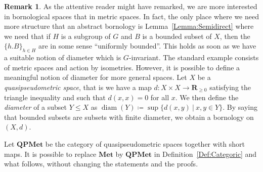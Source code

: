 \documentclass[a4paper]{article}
\newtheorem{prop}[lem]{Proposition}
\theoremstyle{definition}
\newtheorem{rem}[lem]{Remark}
\DeclareMathOperator\diam{diam}
\newcommand*{\field}[1]{\mathbf{#1}}
\newcommand*{\Z}{\field{Z}}
\newcommand{\setst}[2]{\{#1\ |\ #2\}}
\begin{document}
%
%
%
%
%
%
%
%
%
%
\begin{rem}
As the attentive reader might have remarked, we are more interested in bornological spaces that in metric spaces. 
In fact, the only place where we need more structure that an abstract bornology is Lemma~\ref{Lemma:Semidirect} where we need that if $H$ is a subgroup of $G$ and $B$ is a bounded subset of $X$, then the $\{h.B\}_{h\in H}$ are in some sense ``uniformly bounded''.
This holds as soon as we have a suitable notion of diameter which is $G$-invariant.
The standard example consists of metric spaces and action by isometries.
However, it is possible to define a meaningful notion of diameter for more general spaces. Let $X$ be a \emph{quasipseudometric space}, that is we have a map $d\colon X\times X\to\mathbf R_{\geq0}$ satisfying the triangle inequality and such that $d(x,x)=0$ for all $x$.
We then define the \emph{diameter} of a subset $Y\leq X$ as $\diam(Y)\coloneqq\sup\setst{d(x,y)}{x,y\in Y}$.
By saying that bounded subsets are subsets with finite diameter, we obtain a bornology on $(X,d)$.

Let $\mathbf{QPMet}$ be the category of quasipseudometric spaces together with short maps.
It is possible to replace $\mathbf{Met}$ by $\mathbf{QPMet}$ in Definition~\ref{Def:Categoric} and what follows, without changing the statements and the proofs.
\end{rem}
\end{document}
